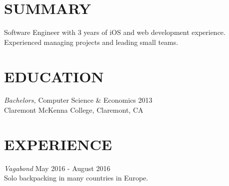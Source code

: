 \documentclass[margin, 10pt]{res} %
\begin{document}
\begin{resume}

\section{SUMMARY}

Software Engineer with 3 years of iOS and web development experience. Experienced managing projects and leading small teams.


\section{EDUCATION}

{\sl Bachelors,} Computer Science \& Economics \hfill 2013 \\
Claremont McKenna College, Claremont, CA


\section{EXPERIENCE}

{\sl Vagabond} \hfill May 2016 - August 2016 \\
Solo backpacking in many countries in Europe.


\end{resume}
\end{document}
